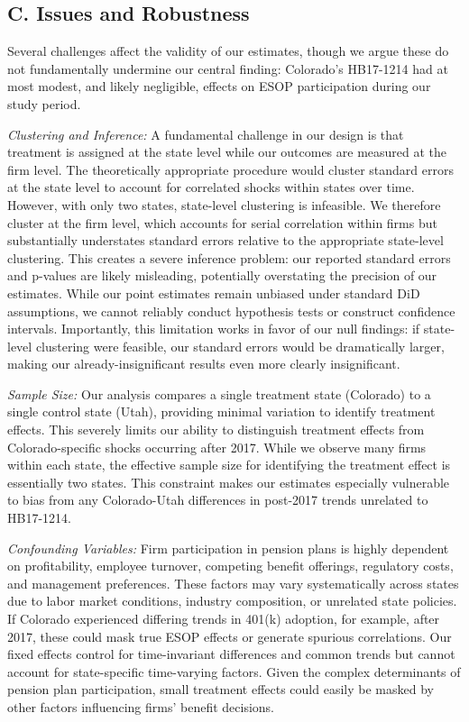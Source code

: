 \documentclass[12pt]{article}
\begin{document}
\subsection*{C. Issues and Robustness}

Several challenges affect the validity of our estimates, though we argue these do not fundamentally undermine our central finding: Colorado's HB17-1214 had at most modest, and likely negligible, effects on ESOP participation during our study period.

\textit{Clustering and Inference:} A fundamental challenge in our design is that treatment is assigned at the state level while our outcomes are measured at the firm level. The theoretically appropriate procedure would cluster standard errors at the state level to account for correlated shocks within states over time. However, with only two states, state-level clustering is infeasible. We therefore cluster at the firm level, which accounts for serial correlation within firms but substantially understates standard errors relative to the appropriate state-level clustering. This creates a severe inference problem: our reported standard errors and p-values are likely misleading, potentially overstating the precision of our estimates. While our point estimates remain unbiased under standard DiD assumptions, we cannot reliably conduct hypothesis tests or construct confidence intervals. Importantly, this limitation works in favor of our null findings: if state-level clustering were feasible, our standard errors would be dramatically larger, making our already-insignificant results even more clearly insignificant.

\textit{Sample Size:} Our analysis compares a single treatment state (Colorado) to a single control state (Utah), providing minimal variation to identify treatment effects. This severely limits our ability to distinguish treatment effects from Colorado-specific shocks occurring after 2017. While we observe many firms within each state, the effective sample size for identifying the treatment effect is essentially two states. This constraint makes our estimates especially vulnerable to bias from any Colorado-Utah differences in post-2017 trends unrelated to HB17-1214.

\textit{Confounding Variables:} Firm participation in pension plans is highly dependent on profitability, employee turnover, competing benefit offerings, regulatory costs, and management preferences. These factors may vary systematically across states due to labor market conditions, industry composition, or unrelated state policies. If Colorado experienced differing trends in 401(k) adoption, for example, after 2017, these could mask true ESOP effects or generate spurious correlations. Our fixed effects control for time-invariant differences and common trends but cannot account for state-specific time-varying factors. Given the complex determinants of pension plan participation, small treatment effects could easily be masked by other factors influencing firms' benefit decisions.
\end{document}
